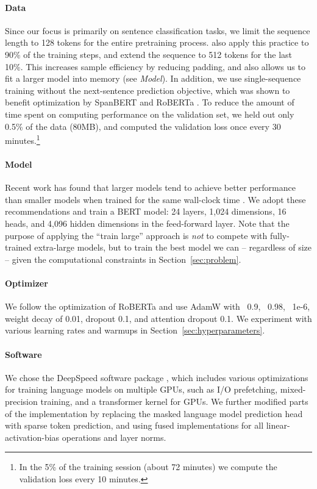 \documentclass[11pt]{article}
\newcommand{\bertlarge}{BERT }
\begin{document}
\paragraph{Data}
Since our focus is primarily on sentence classification tasks, we limit the sequence length to 128 tokens for the entire pretraining process.
\citet{devlin-etal-2019-bert} also apply this practice to 90\% of the training steps, and extend the sequence to 512 tokens for the last 10\%.
This increases sample efficiency by reducing padding, and also allows us to fit a larger model into memory (see \textit{Model}).
In addition, we use single-sequence training without the next-sentence prediction objective, which was shown to benefit optimization by SpanBERT \cite{joshi-etal-2020-spanbert} and RoBERTa \cite{Liu2019RoBERTaAR}.
To reduce the amount of time spent on computing performance on the validation set, we held out only 0.5\% of the data (80MB), and computed the validation loss once every 30 minutes.\footnote{In the 5\% of the training session (about 72 minutes) we compute the validation loss every 10 minutes.}

\paragraph{Model}
Recent work has found that larger models tend to achieve better performance than smaller models when trained for the same wall-clock time \cite{Li2020TrainLT}.
We adopt these recommendations and train a \bertlarge model: 24 layers, 1,024 dimensions, 16 heads, and 4,096 hidden dimensions in the feed-forward layer.
Note that the purpose of applying the ``train large'' approach is \textit{not} to compete with fully-trained extra-large models, but to train the best model we can -- regardless of size -- given the computational constraints in Section~\ref{sec:problem}. 

\paragraph{Optimizer}
We follow the optimization of RoBERTa \cite{Liu2019RoBERTaAR} and use AdamW \cite{Loshchilov2017FixingWD} with ~0.9, ~0.98, ~1e-6, weight decay of 0.01, dropout 0.1, and attention dropout 0.1.
We experiment with various learning rates and warmups in Section~\ref{sec:hyperparameters}.

\paragraph{Software}
We chose the DeepSpeed software package \cite{deepspeed}, which includes various optimizations for training language models on multiple GPUs, such as I/O prefetching, mixed-precision training, and a transformer kernel for GPUs.
We further modified parts of the implementation by replacing the masked language model prediction head with sparse token prediction, and using fused implementations for all linear-activation-bias operations and layer norms.
\end{document}
